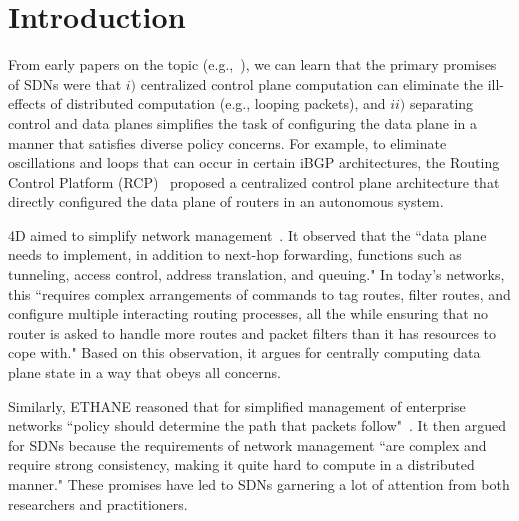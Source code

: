\section{Introduction}
\label{sec:intro}

From early papers on the topic (e.g.,~\cite{rcp-case,rcp,4d,ethane}), we can learn that the primary promises of SDNs were that $i)$  centralized control plane computation can eliminate the ill-effects of distributed computation (e.g., looping packets), and $ii)$ separating control and data planes simplifies the task of configuring the data plane in a manner that satisfies diverse policy concerns.
For example, to eliminate oscillations and loops that can occur in certain iBGP architectures, the Routing Control Platform (RCP)~\cite{rcp-case,rcp} proposed a centralized control plane architecture that directly configured the data plane of routers in an autonomous system.

4D aimed to simplify network management~\cite{4d}. It observed that the ``data plane needs to implement, in addition to next-hop forwarding, functions such as tunneling, access control, address translation, and queuing." In today's networks, this ``requires complex arrangements of commands to tag routes, filter routes, and configure multiple interacting routing processes, all the while ensuring that no router is asked to handle more routes and packet filters than it has resources to cope with." 
Based on this observation, it argues for centrally computing data plane state in a way that obeys all concerns.

Similarly, ETHANE reasoned that for simplified management of enterprise networks ``policy should determine the path that packets follow"~\cite{ethane}. It then argued for SDNs because the requirements of network management ``are complex and require strong consistency, making it quite hard to compute in a distributed manner." These promises have led to SDNs garnering a lot of attention from both researchers and practitioners.

